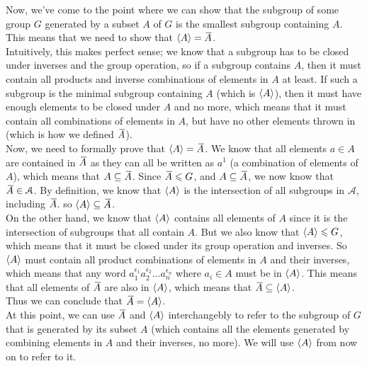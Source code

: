 \documentclass[12pt]{article}
\begin{document}
    Now, we've come to the point where we can show that
    the subgroup of some group $G$
    generated by a subset $A$ of $G$ 
    is the smallest subgroup containing $A$.
    This means that we need to show that $\left\langle A \right\rangle = \,\overline{\!{A}}$. \\
    Intuitively, this makes perfect sense;
    we know that a subgroup has to be closed under inverses
    and the group operation,
    so if a subgroup contains $A$,
    then it must contain all products and inverse combinations
    of elements in $A$ at least.
    If such a subgroup is the minimal subgroup containing $A$
    (which is $\left\langle A \right\rangle$),
    then it must have enough elements to be closed under $A$
    and no more,
    which means that it must contain all combinations of elements
    in $A$,
    but have no other elements thrown in
    (which is how we defined $\,\overline{\!{A}}$). \\
    Now, we need to formally prove that $\left\langle A \right\rangle = \,\overline{\!{A}}$.
    We know that all elements $a \in A$
    are contained in $\,\overline{\!{A}}$
    as they can all be written as $a^1$
    (a combination of elements of $A$),
    which means that $A \subseteq \,\overline{\!{A}}$.
    Since $\,\overline{\!{A}} \leqslant G$,
    and $A \subseteq \,\overline{\!{A}}$,
    we now know that $\,\overline{\!{A}} \in \mathcal{A}$. 
    By definition,
    we know that $\left\langle A \right\rangle$ is the intersection of all 
    subgroups in $\mathcal{A}$,
    including $\,\overline{\!{A}}$.
    so $\left\langle A \right\rangle \subseteq \,\overline{\!{A}}$. \\
    On the other hand,
    we know that $\left\langle A \right\rangle$ contains all elements of $A$
    since it is the intersection of subgroups that all contain $A$.
    But we also know that $\left\langle A \right\rangle \leqslant G$,
    which means that it must be closed under its
    group operation and inverses.
    So $\left\langle A \right\rangle$ must contain all product
    combinations of elements in $A$ and their inverses,
    which means that any word
    $a_1^{\epsilon_1}a_2^{\epsilon_2} \dots a_n^{\epsilon_n}$
    where $a_i \in A$
    must be in $\left\langle A \right\rangle$.
    This means that all elements of $\,\overline{\!{A}}$
    are also in $\left\langle A \right\rangle$,
    which means that $\,\overline{\!{A}} \subseteq \left\langle A \right\rangle$. \\
    Thus we can conclude that $\,\overline{\!{A}} = \left\langle A \right\rangle$. \\

    At this point,
    we can use $\,\overline{\!{A}}$ and $\left\langle A \right\rangle$ interchangebly
    to refer to the subgroup of $G$
    that is generated by its subset $A$
    (which contains all the elements
    generated by combining elements in $A$ and their inverses,
    no more).
    We will use $\left\langle A \right\rangle$ from now on to refer to it. \\
    
\end{document}

